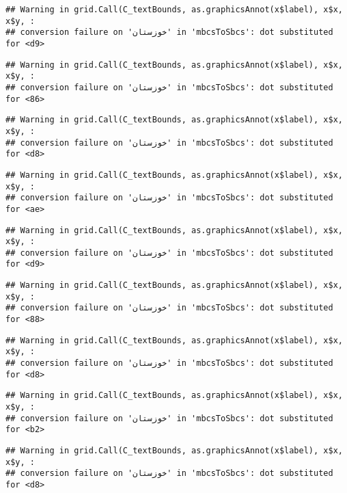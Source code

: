 \documentclass[
]{article}
\begin{document}
\begin{verbatim}
## Warning in grid.Call(C_textBounds, as.graphicsAnnot(x$label), x$x, x$y, :
## conversion failure on 'خوزستان' in 'mbcsToSbcs': dot substituted for <d9>
\end{verbatim}

\begin{verbatim}
## Warning in grid.Call(C_textBounds, as.graphicsAnnot(x$label), x$x, x$y, :
## conversion failure on 'خوزستان' in 'mbcsToSbcs': dot substituted for <86>
\end{verbatim}

\begin{verbatim}
## Warning in grid.Call(C_textBounds, as.graphicsAnnot(x$label), x$x, x$y, :
## conversion failure on 'خوزستان' in 'mbcsToSbcs': dot substituted for <d8>
\end{verbatim}

\begin{verbatim}
## Warning in grid.Call(C_textBounds, as.graphicsAnnot(x$label), x$x, x$y, :
## conversion failure on 'خوزستان' in 'mbcsToSbcs': dot substituted for <ae>
\end{verbatim}

\begin{verbatim}
## Warning in grid.Call(C_textBounds, as.graphicsAnnot(x$label), x$x, x$y, :
## conversion failure on 'خوزستان' in 'mbcsToSbcs': dot substituted for <d9>
\end{verbatim}

\begin{verbatim}
## Warning in grid.Call(C_textBounds, as.graphicsAnnot(x$label), x$x, x$y, :
## conversion failure on 'خوزستان' in 'mbcsToSbcs': dot substituted for <88>
\end{verbatim}

\begin{verbatim}
## Warning in grid.Call(C_textBounds, as.graphicsAnnot(x$label), x$x, x$y, :
## conversion failure on 'خوزستان' in 'mbcsToSbcs': dot substituted for <d8>
\end{verbatim}

\begin{verbatim}
## Warning in grid.Call(C_textBounds, as.graphicsAnnot(x$label), x$x, x$y, :
## conversion failure on 'خوزستان' in 'mbcsToSbcs': dot substituted for <b2>
\end{verbatim}

\begin{verbatim}
## Warning in grid.Call(C_textBounds, as.graphicsAnnot(x$label), x$x, x$y, :
## conversion failure on 'خوزستان' in 'mbcsToSbcs': dot substituted for <d8>
\end{verbatim}
\end{document}

